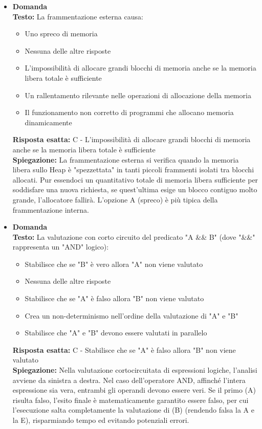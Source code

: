 \documentclass[12pt, a4paper]{article}
\newcounter{domandateoria}
\begin{document}
\begin{itemize}
    \item {}\textbf{Domanda \thedomandateoria} \\
    \textbf{Testo:} La frammentazione esterna causa:
    \begin{itemize}
        \item[A)] Uno spreco di memoria
        \item[B)] Nessuna delle altre risposte
        \item[C)] L'impossibilità di allocare grandi blocchi di memoria anche se la memoria libera totale è sufficiente
        \item[D)] Un rallentamento rilevante nelle operazioni di allocazione della memoria
        \item[E)] Il funzionamento non corretto di programmi che allocano memoria dinamicamente
    \end{itemize}
    \textbf{Risposta esatta:} C - L'impossibilità di allocare grandi blocchi di memoria anche se la memoria libera totale è sufficiente \\
    \textbf{Spiegazione:} La frammentazione esterna si verifica quando la memoria libera sullo Heap è "spezzettata" in tanti piccoli frammenti isolati tra blocchi allocati. Pur essendoci un quantitativo totale di memoria libera sufficiente per soddisfare una nuova richiesta, se quest'ultima esige un blocco contiguo molto grande, l'allocatore fallirà. L'opzione A (spreco) è più tipica della frammentazione interna.
    \vspace{0.3cm}

    \item {}\textbf{Domanda \thedomandateoria} \\
    \textbf{Testo:} La valutazione con corto circuito del predicato "A \&\& B" (dove "\&\&" rappresenta un "AND" logico):
    \begin{itemize}
        \item[A)] Stabilisce che se "B" è vero allora "A" non viene valutato
        \item[B)] Nessuna delle altre risposte
        \item[C)] Stabilisce che se "A" è falso allora "B" non viene valutato
        \item[D)] Crea un non-determinismo nell'ordine della valutazione di "A" e "B"
        \item[E)] Stabilisce che "A" e "B" devono essere valutati in parallelo
    \end{itemize}
    \textbf{Risposta esatta:} C - Stabilisce che se "A" è falso allora "B" non viene valutato \\
    \textbf{Spiegazione:} Nella valutazione cortocircuitata di espressioni logiche, l'analisi avviene da sinistra a destra. Nel caso dell'operatore AND, affinché l'intera espressione sia vera, entrambi gli operandi devono essere veri. Se il primo (A) risulta falso, l'esito finale è matematicamente garantito essere falso, per cui l'esecuzione salta completamente la valutazione di (B) (rendendo falsa la A e la E), risparmiando tempo ed evitando potenziali errori.
    \vspace{0.3cm}


\end{itemize}
\end{document}
